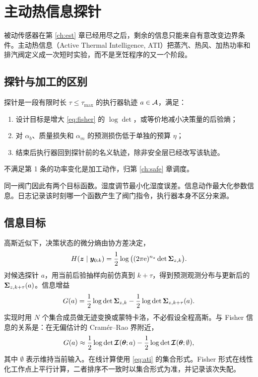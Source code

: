 \chapter{主动热信息探针}
\label{ch:ati}

被动传感器在第 \ref{ch:est} 章已经用尽之后，剩余的信息只能来自有意改变边界条件。主动热信息（Active Thermal Intelligence, ATI）把蒸汽、热风、加热功率和排汽阀定义成一次短时实验，而不是烹饪程序的又一个阶段。

\section{探针与加工的区别}

\begin{definition}[热信息探针]
探针是一段有限时长 $\tau\le\tau_{\max}$ 的执行器轨迹 $a\in\mathcal{A}$，满足：
\begin{enumerate}
\item 设计目标是增大 \eqref{eq:fisher} 的 $\log\det$，或等价地减小决策量的后验熵；
\item 对 $\alpha_b$、质量损失和 $\alpha_m$ 的预测损伤低于单独的预算 $\eta$；
\item 结束后执行器回到探针前的名义轨迹，除非安全层已经改写该轨迹。
\end{enumerate}
不满足第 1 条的功率变化是加工动作，归第 \ref{ch:safe} 章调度。
\end{definition}

同一阀门因此有两个目标函数。湿度调节最小化湿度误差。信息动作最大化参数信息。日志记录该时刻哪一个函数产生了阀门指令，执行器本身不区分来源。

\section{信息目标}

高斯近似下，决策状态的微分熵由协方差决定，
\begin{equation}
H(\bm{z}\mid\bm{y}_{0:k})=\frac12\log\big((2\pi\mathrm{e})^{n_z}\det\bm{\Sigma}_{z,k}\big).
\end{equation}
对候选探针 $a$，用当前后验抽样向前仿真到 $k+\tau$，得到预测观测分布与更新后的 $\bm{\Sigma}_{z,k+\tau}(a)$。信息增益
\begin{equation}
\label{eq:ati}
G(a)=\frac12\log\det\bm{\Sigma}_{z,k}
-\frac12\log\det\bm{\Sigma}_{z,k+\tau}(a).
\end{equation}
实现时用 $N$ 个集合成员做无迹变换或蒙特卡洛，不必假设全程高斯。与 Fisher 信息的关系是：在无偏估计的 Cramér–Rao 界附近，
\begin{equation}
G(a)\approx\frac12\log\det\bm{\mathcal{I}}(\bm{\theta};a)
-\frac12\log\det\bm{\mathcal{I}}(\bm{\theta};\emptyset),
\end{equation}
其中 $\emptyset$ 表示维持当前输入。在线计算使用 \eqref{eq:ati} 的集合形式。Fisher 形式在线性化工作点上平行计算，二者排序不一致时以集合形式为准，并记录该次失配。


